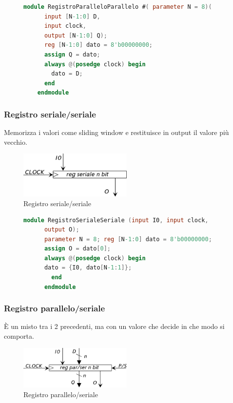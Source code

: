 \documentclass[a4paper]{article}
\theoremstyle{break}
\theoremstyle{break}
\theoremstyle{break}
\theoremstyle{break}
\begin{document}
\begin{figure}[H]
  \begin{lstlisting}[language=Verilog]
    module RegistroParalleloParallelo #( parameter N = 8)(
      input [N-1:0] D,
      input clock,
      output [N-1:0] Q);
      reg [N-1:0] dato = 8'b00000000;
      assign Q = dato;
      always @(posedge clock) begin
        dato = D;
      end
    endmodule
  \end{lstlisting}
\end{figure}

\subsubsection{Registro seriale/seriale}
Memorizza i valori come sliding window e restituisce in output il valore più vecchio.
\begin{figure}[H]
  \begin{center}
    \includegraphics[width=0.50\textwidth]{figures/reg-ss}
  \end{center}
  \caption{Registro seriale/seriale}
\end{figure}

\begin{figure}[H]
  \begin{lstlisting}[language=Verilog]
    module RegistroSerialeSeriale (input I0, input clock,
      output O);
      parameter N = 8; reg [N-1:0] dato = 8'b00000000;
      assign O = dato[0];
      always @(posedge clock) begin
      dato = {I0, dato[N-1:1]};
        end
      endmodule
  \end{lstlisting}
\end{figure}

\subsubsection{Registro parallelo/seriale}
È un misto tra i 2 precedenti, ma con un valore che decide in che modo si comporta.
\begin{figure}[H]
  \begin{center}
    \includegraphics[width=0.50\textwidth]{figures/reg-ps}
  \end{center}
  \caption{Registro parallelo/seriale}
\end{figure}
\end{document}
